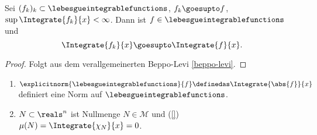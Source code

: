 \begin{satz}\label{beppo-levi-einfach}
  Sei \( (f_k)_k\subset \lebesgueintegrablefunctions \), \( f_k\goesupto f \), \( \sup \Integrate{f_k}{x}<\infty \). Dann ist \( f\in \lebesgueintegrablefunctions \) und 
  \begin{equation*}
    \Integrate{f_k}{x}\goesupto \Integrate{f}{x}.
  \end{equation*}
\end{satz}
\begin{proof}
  Folgt aus dem verallgemeinerten Beppo-Levi \ref{beppo-levi}.
\end{proof}
\begin{folgerung}
  \begin{enumerate}
    \item\label{lebesgue_integrable_funktionen_norm} \( \explicitnorm{\lebesgueintegrablefunctions}{f}\definedas \Integrate{\abs{f}}{x} \) definiert eine Norm auf \( \lebesgueintegrablefunctions \).
    \item\label{nullmengen_funzen_mit_sigma_algebra} \( N\subset \reals^n \) ist Nullmenge \tiff \( N\in \mathcal{M} \) und  (\s \ref{}) \( \mu(N)=\Integrate{\chi_N}{x}=0 \).
  \end{enumerate}
\end{folgerung}
